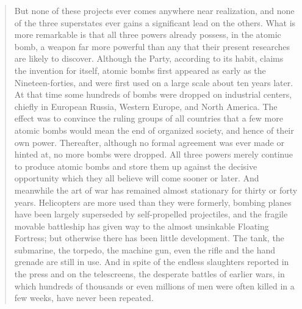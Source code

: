 \begin{quotation}
But none of these projects ever comes anywhere near realization, and
none of the three superstates ever gains a significant lead on the
others. What is more remarkable is that all three powers already
possess, in the atomic bomb, a weapon far more powerful than any that
their present researches are likely to discover. Although the Party,
according to its habit, claims the invention for itself, atomic bombs
first appeared as early as the Nineteen-forties, and were first used on
a large scale about ten years later. At that time some hundreds of bombs
were dropped on industrial centers, chiefly in European Russia, Western
Europe, and North America. The effect was to convince the ruling groups
of all countries that a few more atomic bombs would mean the end of
organized society, and hence of their own power. Thereafter, although no
formal agreement was ever made or hinted at, no more bombs were dropped.
All three powers merely continue to produce atomic bombs and store them
up against the decisive opportunity which they all believe will come
sooner or later. And meanwhile the art of war has remained almost
stationary for thirty or forty years. Helicopters are more used than
they were formerly, bombing planes have been largely superseded by
self-propelled projectiles, and the fragile movable battleship has given
way to the almost unsinkable Floating Fortress; but otherwise there has
been little development. The tank, the submarine, the torpedo, the
machine gun, even the rifle and the hand grenade are still in use. And
in spite of the endless slaughters reported in the press and on the
telescreens, the desperate battles of earlier wars, in which hundreds of
thousands or even millions of men were often killed in a few weeks, have
never been repeated.


\end{quotation}
